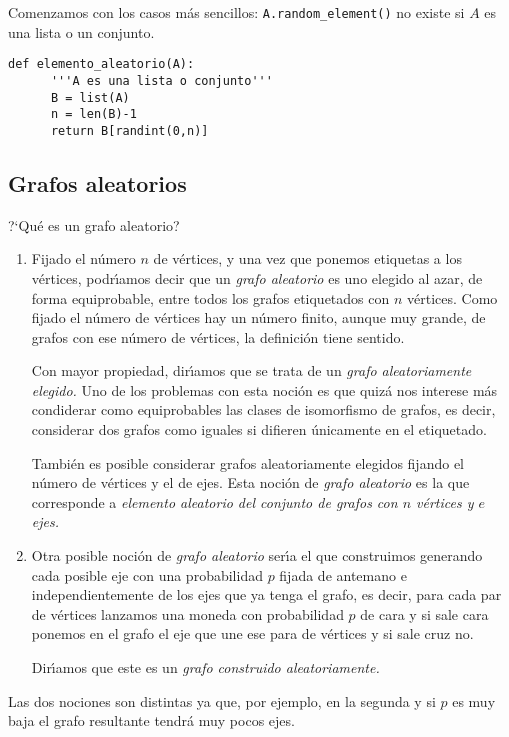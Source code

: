  
 Comenzamos con los casos m\'as sencillos: \lstinline|A.random_element()| no 
existe si $A$ es una lista o un conjunto.
 
 \begin{lstlisting}
def elemento_aleatorio(A):
      '''A es una lista o conjunto'''
      B = list(A)
      n = len(B)-1
      return B[randint(0,n)]
\end{lstlisting}

 
 \subsection{Grafos aleatorios}
  ?`Qu\'e es un grafo aleatorio?
  \begin{enumerate}
   \item Fijado el n\'umero $n$ de v\'ertices, y una vez que ponemos etiquetas 
a los v\'ertices, podr\'{\i}amos decir que un {\itshape grafo aleatorio} es uno 
elegido al azar, de forma equiprobable, entre todos los grafos etiquetados con 
$n$ v\'ertices. Como fijado el n\'umero de v\'ertices hay un n\'umero finito, 
aunque muy grande,  de grafos con ese n\'umero de v\'ertices, la definici\'on 
tiene sentido.

Con mayor propiedad, dir\'{\i}amos que se trata de un {\itshape grafo 
aleatoriamente elegido.} Uno de los problemas con esta noci\'on es que quiz\'a 
nos interese m\'as condiderar como equiprobables las clases de isomorfismo de 
grafos, es decir, considerar dos grafos como iguales si difieren \'unicamente 
en el etiquetado. 

Tambi\'en es posible considerar grafos aleatoriamente elegidos fijando el 
n\'umero de v\'ertices y el de ejes. Esta noci\'on de {\itshape grafo 
aleatorio} es la que corresponde a {\itshape elemento aleatorio del conjunto de 
grafos con $n$ v\'ertices y $e$ ejes.}
   
  \item Otra posible noci\'on de {\itshape grafo aleatorio} ser\'{\i}a el que 
construimos  generando cada posible eje con una probabilidad $p$ fijada de 
antemano e independientemente de los ejes que ya tenga el grafo, es decir, para 
cada par de v\'ertices lanzamos una moneda con probabilidad $p$ de cara y si 
sale cara ponemos en el grafo el eje que une ese para de v\'ertices y si sale 
cruz no. 

Dir\'{\i}amos que este es un {\itshape grafo construido aleatoriamente.}
 \end{enumerate}
 
 Las dos nociones son distintas ya que, por ejemplo, en la segunda y si $p$ es 
muy baja el grafo resultante tendr\'a muy pocos ejes.

